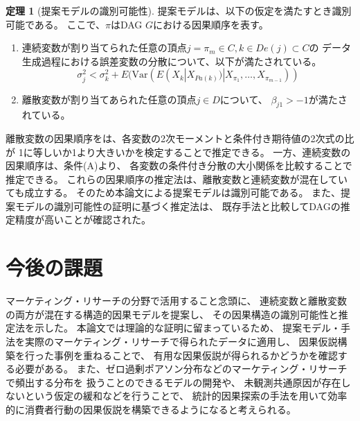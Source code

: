 \documentclass[uplatex]{jsarticle}
\theoremstyle{definition}
\newtheorem{theo}[df]{定理}
\begin{document}
\begin{theo}[提案モデルの識別可能性]
  提案モデルは、以下の仮定を満たすとき識別可能である。
  ここで、$\pi$はDAG $G$における因果順序を表す。
  \begin{enumerate}[label=(\Alph*)]
    \item
    連続変数が割り当てられた任意の頂点$j = \pi_m \in C, k \in De(j) \subset C$の
    データ生成過程における誤差変数の分散について、以下が満たされている。
    \begin{equation*}
      \sigma_j^2 < \sigma_k^2 + E(\mathrm{Var}(E(X_k | X_{Pa(k)}) | X_{\pi_1}, \dots, X_{\pi_{m-1}}))
    \end{equation*}

    \item
    離散変数が割り当てあられた任意の頂点$j \in D$について、
    $\beta_{j1} > -1$が満たされている。
  \end{enumerate}
\end{theo}

離散変数の因果順序をは、各変数の2次モーメントと条件付き期待値の2次式の比が
1に等しいか1より大きいかを検定することで推定できる。
一方、連続変数の因果順序は、条件(A)より、
各変数の条件付き分散の大小関係を比較することで推定できる。
これらの因果順序の推定法は、離散変数と連続変数が混在していても成立する。
そのため本論文による提案モデルは識別可能である。
また、提案モデルの識別可能性の証明に基づく推定法は、
既存手法と比較してDAGの推定精度が高いことが確認された。

\section{今後の課題}
マーケティング・リサーチの分野で活用すること念頭に、
連続変数と離散変数の両方が混在する構造的因果モデルを提案し、
その因果構造の識別可能性と推定法を示した。
本論文では理論的な証明に留まっているため、
提案モデル・手法を実際のマーケティング・リサーチで得られたデータに適用し、
因果仮説構築を行った事例を重ねることで、
有用な因果仮説が得られるかどうかを確認する必要がある。
また、ゼロ過剰ポアソン分布などのマーケティング・リサーチで頻出する分布を
扱うことのできるモデルの開発や、
未観測共通原因が存在しないという仮定の緩和などを行うことで、
統計的因果探索の手法を用いて効率的に消費者行動の因果仮説を構築できるようになると考えられる。




\end{document}
